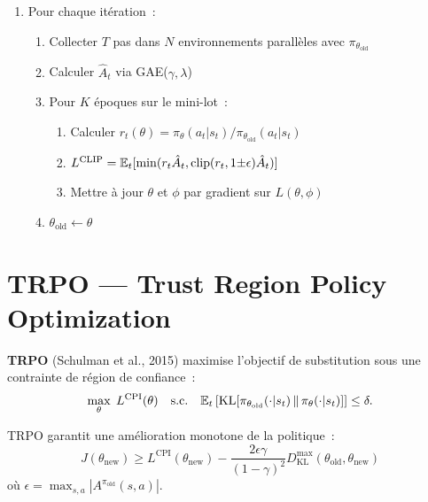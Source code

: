\begin{algorithme}[title=\textbf{PPO}]
\begin{enumerate}
    \item Pour chaque it\'eration~:
    \begin{enumerate}
        \item Collecter $T$ pas dans $N$ environnements parall\`eles avec $\pi_{\theta_{\text{old}}}$
        \item Calculer $\hat{A}_t$ via GAE($\gamma, \lambda$)
        \item Pour $K$ \'epoques sur le mini-lot~:
        \begin{enumerate}
            \item Calculer $r_t(\theta) = \pi_\theta(a_t|s_t) / \pi_{\theta_{\text{old}}}(a_t|s_t)$
            \item $L^{\text{CLIP}} = \mathbb{E}_t[\min(r_t \hat{A}_t, \text{clip}(r_t, 1{\pm}\epsilon)\hat{A}_t)]$
            \item Mettre \`a jour $\theta$ et $\phi$ par gradient sur $L(\theta, \phi)$
        \end{enumerate}
        \item $\theta_{\text{old}} \leftarrow \theta$
    \end{enumerate}
\end{enumerate}
\end{algorithme}

\section{TRPO --- Trust Region Policy Optimization}

\begin{definition}[TRPO]
\textbf{TRPO} (Schulman et al., 2015) maximise l'objectif de substitution
sous une contrainte de r\'egion de confiance~:
\[
    \max_\theta \; L^{\text{CPI}}(\theta) \quad \text{s.c.} \quad
    \mathbb{E}_t\left[\text{KL}[\pi_{\theta_{\text{old}}}(\cdot|s_t) \,\|\, \pi_\theta(\cdot|s_t)]\right] \leq \delta.
\]
\end{definition}

\begin{theoreme}
TRPO garantit une am\'elioration monotone de la politique~:
\[
    J(\theta_{\text{new}}) \geq L^{\text{CPI}}(\theta_{\text{new}})
    - \frac{2\epsilon\gamma}{(1-\gamma)^2} D_{\text{KL}}^{\max}(\theta_{\text{old}}, \theta_{\text{new}})
\]
o\`u $\epsilon = \max_{s,a} |A^{\pi_{\text{old}}}(s,a)|$.
\end{theoreme}

